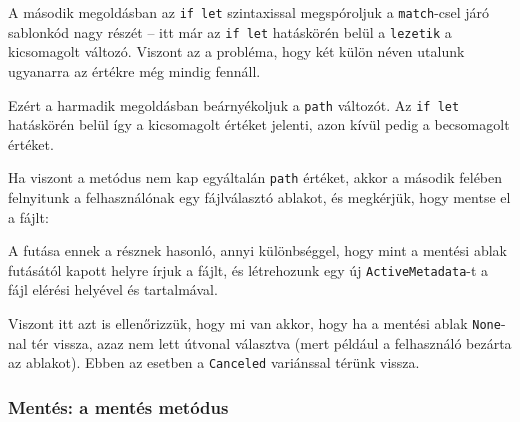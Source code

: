 A második megoldásban az \texttt{if let} szintaxissal megspóroljuk a \texttt{match}-csel
járó sablonkód nagy részét -- itt már az \texttt{if let} hatáskörén belül a \texttt{lezetik} a kicsomagolt változó.
Viszont az a probléma, hogy két külön néven utalunk ugyanarra az értékre még mindig fennáll.

Ezért a harmadik megoldásban beárnyékoljuk a \texttt{path} változót.
Az \texttt{if let} hatáskörén belül így a kicsomagolt értéket jelenti, 
azon kívül pedig a becsomagolt értéket.

Ha viszont a metódus nem kap egyáltalán \texttt{path} értéket, 
akkor a második felében felnyitunk a felhasználónak egy fájlválasztó ablakot,
és megkérjük, hogy mentse el a fájlt: 



A futása ennek a résznek hasonló, annyi különbséggel, hogy mint a mentési ablak futásától
kapott helyre írjuk a fájlt, és létrehozunk egy új \texttt{ActiveMetadata}-t
a fájl elérési helyével és tartalmával.

Viszont itt azt is ellenőrizzük, hogy mi van akkor, hogy ha a mentési ablak \texttt{None}-nal
tér vissza, azaz nem lett útvonal választva (mert például a felhasználó bezárta az ablakot).
Ebben az esetben a \texttt{Canceled} variánssal térünk vissza.

\subsubsection{Mentés: a mentés metódus}





